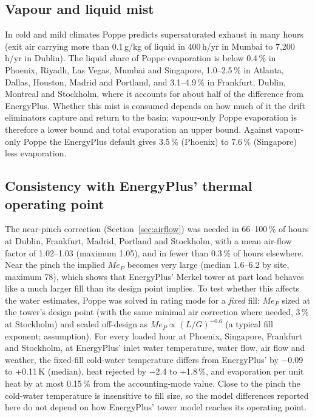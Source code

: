 \documentclass[preprint,12pt,authoryear]{elsarticle}
\begin{document}
\subsection{Vapour and liquid mist}\label{sec:mist}
In cold and mild climates Poppe predicts supersaturated exhaust in many hours (exit air carrying more than 0.1\,g/kg of
liquid in 400\,h/yr in Mumbai to 7,200\,h/yr in Dublin). The liquid share of Poppe evaporation is below 0.4\,\% in Phoenix, Riyadh, Las Vegas, Mumbai
and Singapore, 1.0--2.5\,\% in Atlanta, Dallas, Houston, Madrid and Portland, and 3.1--4.9\,\% in Frankfurt, Dublin,
Montreal and Stockholm, where it accounts for about half of the difference
from EnergyPlus. Whether this mist is consumed depends on how much of it the drift eliminators capture and return to the
basin; vapour-only Poppe evaporation is therefore a lower bound and total evaporation an upper bound. Against vapour-only
Poppe the EnergyPlus default gives 3.5\,\% (Phoenix) to 7.6\,\% (Singapore) less evaporation.

\subsection{Consistency with EnergyPlus' thermal operating point}\label{sec:consistency}
The near-pinch correction (Section~\ref{sec:airflow}) was needed in 66--100\,\% of hours at Dublin, Frankfurt, Madrid,
Portland and Stockholm, with a mean air-flow factor of 1.02--1.03 (maximum 1.05), and in fewer than 0.3\,\% of hours
elsewhere. Near the pinch the implied $Me_P$ becomes very large (median 1.6--6.2 by site, maximum 78), which shows that
EnergyPlus' Merkel tower at part load behaves like a much larger fill than its design point implies. To test whether
this affects the water estimates, Poppe was solved in rating mode for a \emph{fixed} fill: $Me_P$ sized at the tower's
design point (with the same minimal air correction where needed, 3\,\% at Stockholm) and scaled off-design as
$Me_P\propto(L/G)^{-0.6}$ (a typical fill exponent; assumption). For every loaded hour at Phoenix, Singapore, Frankfurt and
Stockholm, at EnergyPlus' inlet water temperature, water flow, air flow and weather, the fixed-fill cold-water
temperature differs from EnergyPlus' by $-$0.09 to +0.11\,K (median), heat rejected by $-$2.4 to +1.8\,\%, and
evaporation per unit heat by at most 0.15\,\% from the accounting-mode value. Close to the pinch the cold-water temperature
is insensitive to fill size, so the model differences reported here do not depend on how EnergyPlus' tower model
reaches its operating point.
\end{document}
